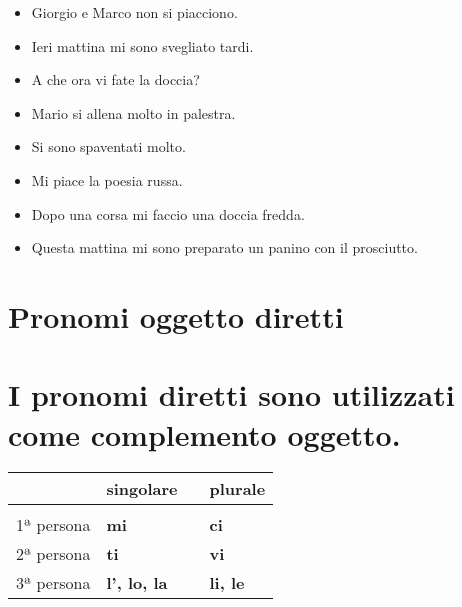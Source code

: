 \documentclass[letter,11pt]{article}
\begin{document}
\vskip 0.5in

\begin{multicols}{2}
\begin{itemize}
    \item Giorgio e Marco non si piacciono.
    \item Ieri mattina mi sono svegliato tardi.
    \item A che ora vi fate la doccia?
    \item Mario si allena molto in palestra.
    \item Si sono spaventati molto.
    \item Mi piace la poesia russa.
    \item Dopo una corsa mi faccio una doccia fredda.
    \item Questa mattina mi sono preparato un panino con il prosciutto.


\end{itemize}
\end{multicols}


\vskip 0.2in
\section*{Pronomi oggetto diretti}
\section*{I pronomi diretti sono utilizzati come complemento oggetto.}
\vskip 0.2in

\begin{tabular}{ |p{3cm}| p{2cm}| p{0.2cm}| p{2cm}| }
      & singolare  &    &   plurale  \\
    \hline
    \hline
     &  &      &  \\ \hline
    1ª persona & {\bf mi}   &   &  {\bf ci}  \\ \hline
    2ª persona & {\bf ti}   &   &  {\bf vi}  \\ \hline
    3ª persona & {\bf l', lo, la}   &   &  {\bf li, le}  \\ \hline
    \hline
\end{tabular}

\vskip 0.5in
\end{document}
